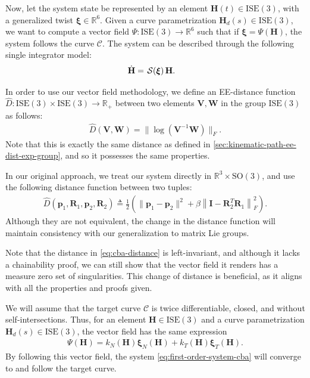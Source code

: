 Now, let the system state be represented by an element $\mathbf{H}(t)\in\text{ISE}(3)$, with a generalized twist $\boldsymbol{\xi}\in\mathbb{R}^6$. Given a curve parametrization $\mathbf{H}_d(s)\in\text{ISE}(3)$, we want to compute a vector field $\Psi:\text{ISE}(3)\to\mathbb{R}^6$ such that if $\boldsymbol{\xi} = \Psi(\mathbf{H})$, the system follows the curve $\mathcal{C}$. The system can be described through the following single integrator model:
\begin{align}
    \dot{\mathbf{H}} &= \SL[\boldsymbol{\xi}]\mathbf{H}.\label{eq:first-order-system-cba}
\end{align}

In order to use our vector field methodology, we define an EE-distance function $\widehat{D}: \text{ISE}(3) \times \text{ISE}(3) \to \mathbb{R}_+$ between two elements $\mathbf{V}, \mathbf{W}$ in the group $\text{ISE}(3)$ as follows:
\begin{align}
    \widehat{D}(\mathbf{V}, \mathbf{W}) = \| \log(\mathbf{V}^{-1}\mathbf{W}) \|_F. \label{eq:cba-distance-new}
\end{align}
Note that this is exactly the same distance as defined in \cref{sec:kinematic-path-ee-dist-exp-group}, and so it possesses the same properties.
\begin{remark}
    In our original approach, we treat our system directly in $\mathbb{R}^3\times\text{SO}(3)$, and use the following distance function between two tuples:
    \begin{align}
        \widehat{D}(\mathbf{p}_1, \mathbf{R}_1, \mathbf{p}_2, \mathbf{R}_2) \triangleq \frac{1}{2}\left(\|\mathbf{p}_1 - \mathbf{p}_2\|^2 + \beta\left\|\mathbf{I} - \mathbf{R}_2^{T}\mathbf{R}_1\right\|^2_F\right). \label{eq:cba-distance}
    \end{align}
    Although they are not equivalent, the change in the distance function will maintain consistency with our generalization to matrix Lie groups.
    
    Note that the distance in \eqref{eq:cba-distance} is left-invariant, and although it lacks a chainability proof, we can still show that the vector field it renders has a measure zero set of singularities. This change of distance is beneficial, as it aligns with all the properties and proofs given.
\end{remark}

We will assume that the target curve $\mathcal{C}$ is twice differentiable, closed, and without self-intersections. Thus, for an element $\mathbf{H}\in\text{ISE}(3)$ and a curve parametrization $\mathbf{H}_d(s)\in\text{ISE}(3)$, the vector field has the same expression
\begin{align}
    \Psi(\mathbf{H}) = k_N(\mathbf{H})\boldsymbol{\xi}_N(\mathbf{H}) + k_T(\mathbf{H})\boldsymbol{\xi}_T(\mathbf{H}).
\end{align}
By following this vector field, the system \eqref{eq:first-order-system-cba} will converge to and follow the target curve.

